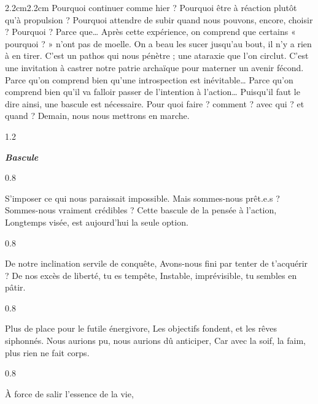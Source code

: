 \begin{adjustwidth}{2.2cm}{2.2cm}
Pourquoi continuer comme hier ? Pourquoi être à réaction plutôt qu’à propulsion ? Pourquoi attendre de subir quand nous pouvons, encore, choisir ? Pourquoi ? Parce que… Après cette expérience, on comprend que certains « pourquoi ? » n’ont pas de moelle. On a beau les sucer jusqu’au bout, il n’y a rien à en tirer. C’est un pathos qui nous pénètre ; une ataraxie que l’on circlut. C’est une invitation à castrer notre patrie archaïque pour materner un avenir fécond. Parce qu’on comprend bien qu’une introspection est inévitable… Parce qu’on comprend bien qu’il va falloir passer de l’intention à l’action… Puisqu’il faut le dire ainsi, une bascule est nécessaire. Pour quoi faire ? comment ? avec qui ? et quand ? Demain, nous nous mettrons en marche.
\begin{spacing}{1.2}
~
\end{spacing}
\begin{center}
\noindent \textbf{\textit{Bascule}}
\end{center}
\begin{spacing}{0.8}
~
\end{spacing}
\noindent S’imposer ce qui nous paraissait impossible.
\newline Mais sommes-nous prêt.e.s ? Sommes-nous vraiment crédibles ?
\newline Cette bascule de la pensée à l’action,
\newline \noindent Longtemps visée, est aujourd’hui la seule option.
\newline ~
\begin{spacing}{0.8}
~
\end{spacing}
\noindent De notre inclination servile de conquête,
\newline Avons-nous fini par tenter de t’acquérir ?
\newline De nos excès de liberté, tu es tempête,
\newline Instable, imprévisible, tu sembles en pâtir.
\begin{spacing}{0.8}
~
\end{spacing}
\noindent Plus de place pour le futile énergivore,
\newline Les objectifs fondent, et les rêves siphonnés.
\newline Nous aurions pu, nous aurions dû anticiper,
\newline Car avec la soif, la faim, plus rien ne fait corps.
\begin{spacing}{0.8}
~
\end{spacing}
\noindent À force de salir l’essence de la vie,

\end{adjustwidth}
